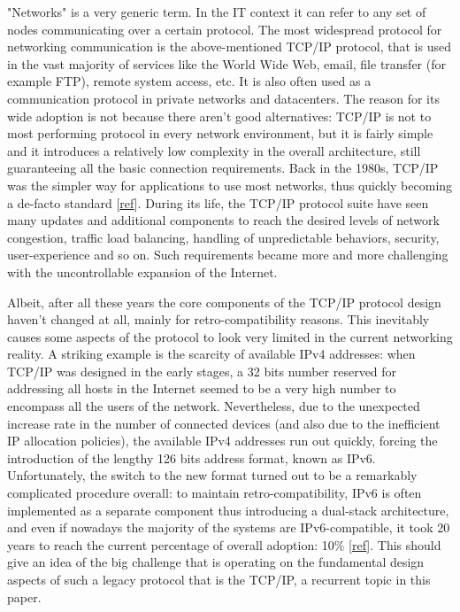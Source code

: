 "Networks" is a very generic term. In the IT context it can refer to any set of nodes communicating over a certain protocol. The most widespread protocol for networking communication is the above-mentioned TCP/IP protocol, that is used in the vast majority of services like the World Wide Web, email, file transfer (for example FTP), remote system access, etc. It is also often used as a communication protocol in private networks and datacenters.
The reason for its wide adoption is not because there aren't good alternatives: TCP/IP is not to most performing protocol in every network environment, but it is fairly simple and it introduces a relatively low complexity in the overall architecture, still guaranteeing all the basic connection requirements. Back in the 1980s, TCP/IP was the simpler way for applications to use most networks, thus quickly becoming a de-facto standard [\href{http://www.computerworld.com/article/2593612/networking/tcp-ip.html}{ref}]. 
During its life, the TCP/IP protocol suite have seen many updates and additional components to reach the desired levels of network congestion, traffic load balancing, handling of unpredictable behaviors, security, user-experience and so on. Such requirements became more and more challenging with the uncontrollable expansion of the Internet. 


Albeit, after all these years the core components of the TCP/IP protocol design haven't changed at all, mainly for retro-compatibility reasons. This inevitably causes some aspects of the protocol to look very limited in the current networking reality. A striking example is the scarcity of available IPv4 addresses: when TCP/IP was designed in the early stages, a 32 bits number reserved for addressing all hosts in the Internet seemed to be a very high number to encompass all the users of the network. Nevertheless, due to the unexpected increase rate in the number of connected devices (and also due to the inefficient IP allocation policies), the available IPv4 addresses run out quickly, forcing the introduction of the lengthy 126 bits address format, known as IPv6. Unfortunately, the switch to the new format turned out to be a remarkably complicated procedure overall: to maintain retro-compatibility, IPv6 is often implemented as a separate component thus introducing a dual-stack architecture, and even if nowadays the majority of the systems are IPv6-compatible, it took 20 years to reach the current percentage of overall adoption: 10\% [\href{http://www.google.com/intl/en/ipv6/statistics.html#tab=ipv6-adoption&tab=ipv6-adoption}{ref}]. This should give an idea of the big challenge that is operating on the fundamental design aspects of such a legacy protocol that is the TCP/IP, a recurrent topic in this paper.

